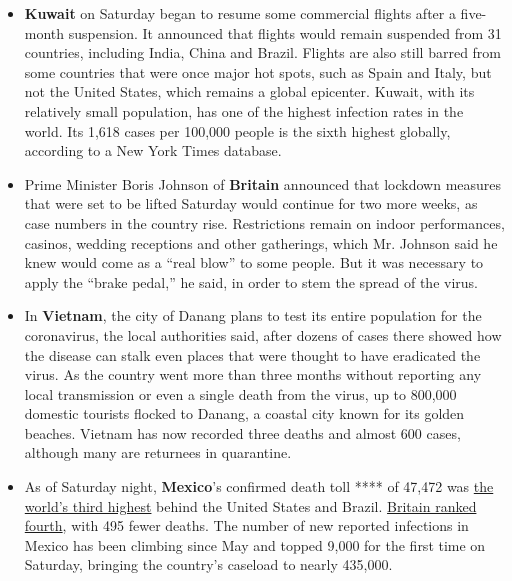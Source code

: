 \begin{itemize}
\item
  \textbf{Kuwait} on Saturday began to resume some commercial flights
  after a five-month suspension. It announced that flights would remain
  suspended from 31 countries, including India, China and Brazil.
  Flights are also still barred from some countries that were once major
  hot spots, such as Spain and Italy, but not the United States, which
  remains a global epicenter. Kuwait, with its relatively small
  population, has one of the highest infection rates in the world. Its
  1,618 cases per 100,000 people is the sixth highest globally,
  according to a New York Times database.
\item
  Prime Minister Boris Johnson of \textbf{Britain} announced that
  lockdown measures that were set to be lifted Saturday would continue
  for two more weeks, as case numbers in the country rise. Restrictions
  remain on indoor performances, casinos, wedding receptions and other
  gatherings, which Mr. Johnson said he knew would come as a ``real
  blow'' to some people. But it was necessary to apply the ``brake
  pedal,'' he said, in order to stem the spread of the virus.
\item
  In \textbf{Vietnam}, the city of Danang plans to test its entire
  population for the coronavirus, the local authorities said, after
  dozens of cases there showed how the disease can stalk even places
  that were thought to have eradicated the virus. As the country went
  more than three months without reporting any local transmission or
  even a single death from the virus, up to 800,000 domestic tourists
  flocked to Danang, a coastal city known for its golden beaches.
  Vietnam has now recorded three deaths and almost 600 cases, although
  many are returnees in quarantine.
\item
  As of Saturday night, \textbf{Mexico}'s confirmed death toll **** of
  47,472 was
  \href{https://www.nytimes.com/interactive/2020/world/americas/mexico-coronavirus-cases.html}{the
  world's third highest} behind the United States and Brazil.
  \href{https://www.nytimes.com/interactive/2020/world/europe/united-kingdom-coronavirus-cases.html}{Britain
  ranked fourth}, with 495 fewer deaths. The number of new reported
  infections in Mexico has been climbing since May and topped 9,000 for
  the first time on Saturday, bringing the country's caseload to nearly
  435,000.
\end{itemize}

